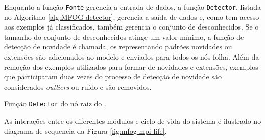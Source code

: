 Enquanto a função \texttt{Fonte} gerencia a entrada de dados, a função
\texttt{Detector}, listada no Algoritmo \ref{alg:MFOG-detector}, gerencia a saída
de dados e, como tem acesso aos exemplos já classificados, também gerencia o
conjunto de desconhecidos.
Se o tamanho do conjunto de desconhecidos atinge um valor mínimo, a função de
detecção de novidade é chamada, os \mclusters representando padrões novidades ou
extensões são adicionados ao modelo e enviados para todos os nós folha.
Além da remoção dos exemplos utilizados para formar \mclusters de novidades e
extensões, exemplos que participaram duas vezes do processo de detecção de
novidade são considerados \emph{outliers} ou ruído e são removidos.

\begin{algorithm}[htb]
    
\caption{Função \texttt{Detector} do nó raiz do \mfog.}
\label{alg:MFOG-detector}
\end{algorithm}

As interações entre os diferentes módulos e ciclo de vida do sistema é ilustrado
no diagrama de sequencia da Figura \ref{fig:mfog-mpi-life}.

